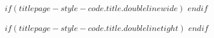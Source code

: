 $if(titlepage-style-code.title.doublelinewide)$
\newcommand{\titlepagetitleblock}{%
\rule{\textwidth}{0.4pt} %
\vspace{0.025\textheight} %

\titleandsubtitle

\vspace{0.025\textheight}
\rule{0.3\textwidth}{0.4pt} %
}$endif$

$if(titlepage-style-code.title.doublelinetight)$
\newcommand{\titlepagetitleblock}{%
\newcommand{\HRule}{\rule{\linewidth}{0.5mm}}

\HRule\\[0.4cm]

\titleandsubtitle

\HRule\\
}$endif$
